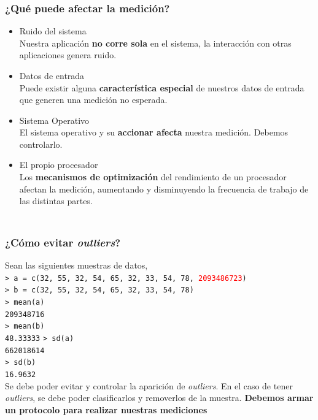 \documentclass[aspectratio=169]{beamer}
\newcommand{\tab}[0]{\hspace{15pt}}
\begin{document}
\begin{frame}[fragile]
    \frametitle{ \vspace{-1cm} \flushright \colorbox{verdeuca}{ \small \textcolor{white}{ \footnotesize \secname } }\\
    ¿Qué puede afectar la medición?}
    \begin{itemize}
     \item \Large Ruido del sistema \normalsize \\
     Nuestra aplicación \textbf{no corre sola} en el sistema, la interacción con otras aplicaciones genera ruido.
     \vskip 10pt  \pause
     \item \Large Datos de entrada \normalsize \\
     Puede existir alguna \textbf{característica especial} de nuestros datos de entrada que generen una medición no esperada.
     \vskip 10pt  \pause
     \item \Large Sistema Operativo \normalsize \\
     El sistema operativo y su \textbf{accionar afecta} nuestra medición. Debemos controlarlo.
    \vskip 10pt  \pause
     \item \Large El propio procesador \normalsize \\
     Los \textbf{mecanismos de optimización} del rendimiento de un procesador afectan la medición,
     aumentando y disminuyendo la frecuencia de trabajo de las distintas partes.
    \end{itemize}
\end{frame}

\begin{frame}[fragile]
    \frametitle{ \vspace{-1cm} \flushright \colorbox{verdeuca}{ \small \textcolor{white}{ \footnotesize \secname } }\\
    ¿Cómo evitar \emph{outliers}?}
    Sean las siguientes muestras de datos,\\
    \vskip 5pt
    \small \texttt{> a = c(\textcolor{verdeuca}{32, 55, 32, 54, 65, 32, 33, 54, 78,} \textcolor{red}{2093486723}) }\\
    \small \texttt{> b = c(\textcolor{verdeuca}{32, 55, 32, 54, 65, 32, 33, 54, 78}) }\\
    \vskip 5pt \pause
    \small \texttt{> mean(a)}\\
    \small \texttt{\tab \tab \tab \tab 209348716}\\
    \small \texttt{> mean(b)}\\
    \small \texttt{\tab \tab \tab \tab 48.33333}
    \vskip 5pt
    \small \texttt{> sd(a)}\\
    \small \texttt{\tab \tab \tab \tab 662018614}\\
    \small \texttt{> sd(b)}\\
    \small \texttt{\tab \tab \tab \tab 16.9632}\\
    \vskip 5pt \pause
    Se debe poder evitar y controlar la aparición de \emph{outliers}.
    En el caso de tener \emph{outliers}, se debe poder clasificarlos y removerlos de la muestra.
    \vskip 5pt
    \textbf{Debemos armar un protocolo para realizar nuestras mediciones}
\end{frame}
\end{document}
